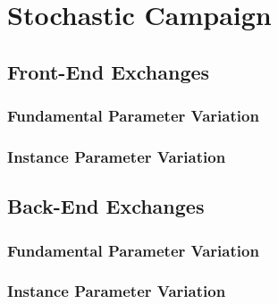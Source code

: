 
\section{Stochastic Campaign}\label{results:stochastic}

\subsection{Front-End Exchanges}

\subsubsection{Fundamental Parameter Variation}

\subsubsection{Instance Parameter Variation}

\subsection{Back-End Exchanges}

\subsubsection{Fundamental Parameter Variation}

\subsubsection{Instance Parameter Variation}
